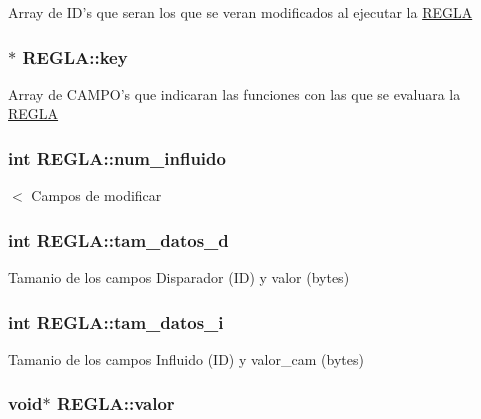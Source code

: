 \label{structREGLA_aba3a533e68fa21a4d3fef8122b945699}
Array de ID's que seran los que se veran modificados al ejecutar la \hyperlink{structREGLA}{REGLA} \hypertarget{structREGLA_a03be3583ba759e8df930b76b66ad9442}{
\subsubsection[{key}]{$\ast$ {\bf REGLA::key}}}
\label{structREGLA_a03be3583ba759e8df930b76b66ad9442}
Array de CAMPO's que indicaran las funciones con las que se evaluara la \hyperlink{structREGLA}{REGLA} \hypertarget{structREGLA_a7d11e3a4fbf9254b9e59605d8037f0fa}{
\subsubsection[{num\_\-influido}]{\setlength{\rightskip}{0pt plus 5cm}int {\bf REGLA::num\_\-influido}}}
\label{structREGLA_a7d11e3a4fbf9254b9e59605d8037f0fa}
$<$ Campos de modificar \hypertarget{structREGLA_a85085eaff016bd2aa9fd04e066706082}{
\subsubsection[{tam\_\-datos\_\-d}]{\setlength{\rightskip}{0pt plus 5cm}int {\bf REGLA::tam\_\-datos\_\-d}}}
\label{structREGLA_a85085eaff016bd2aa9fd04e066706082}
Tamanio de los campos Disparador (ID) y valor (bytes) \hypertarget{structREGLA_a016c1d6ba88a9f85f03cc013ea2743f3}{
\subsubsection[{tam\_\-datos\_\-i}]{\setlength{\rightskip}{0pt plus 5cm}int {\bf REGLA::tam\_\-datos\_\-i}}}
\label{structREGLA_a016c1d6ba88a9f85f03cc013ea2743f3}
Tamanio de los campos Influido (ID) y valor\_\-cam (bytes) \hypertarget{structREGLA_ab25ddb664e80c62a9025cbcbc9f0c03c}{
\subsubsection[{valor}]{\setlength{\rightskip}{0pt plus 5cm}void$\ast$ {\bf REGLA::valor}}}
